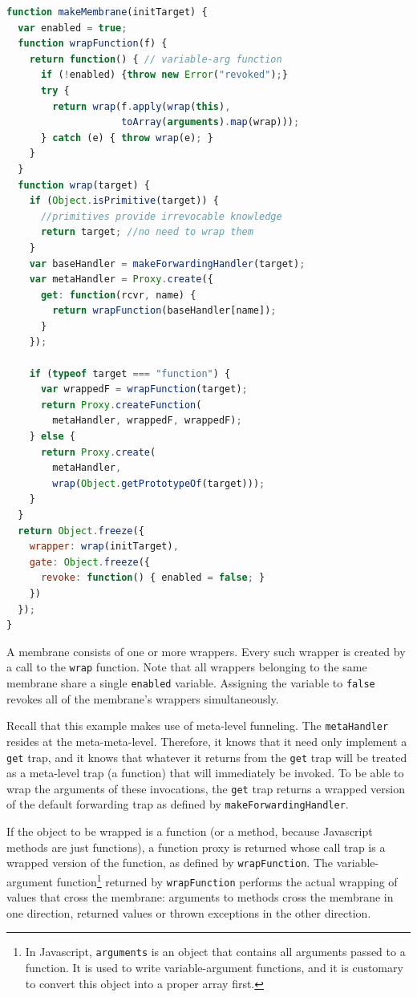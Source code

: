 \documentclass{acm_proc_article-sp}
\begin{document}
\begin{lstlisting}[language=javascript]
function makeMembrane(initTarget) {
  var enabled = true;
  function wrapFunction(f) {
    return function() { // variable-arg function
      if (!enabled) {throw new Error("revoked");}
      try {
        return wrap(f.apply(wrap(this),
                    toArray(arguments).map(wrap)));
      } catch (e) { throw wrap(e); } 
    }
  }
  function wrap(target) {
    if (Object.isPrimitive(target)) {
      //primitives provide irrevocable knowledge
      return target; //no need to wrap them
    } 
    var baseHandler = makeForwardingHandler(target);
    var metaHandler = Proxy.create({
      get: function(rcvr, name) {
        return wrapFunction(baseHandler[name]);
      }
    });
    
    if (typeof target === "function") {
      var wrappedF = wrapFunction(target);
      return Proxy.createFunction(
        metaHandler, wrappedF, wrappedF);
    } else {
      return Proxy.create(
        metaHandler,
        wrap(Object.getPrototypeOf(target)));
    }
  }
  return Object.freeze({
    wrapper: wrap(initTarget),
    gate: Object.freeze({
      revoke: function() { enabled = false; }
    })
  });
}
\end{lstlisting}

A membrane consists of one or more wrappers. Every such wrapper is created by a call to the \texttt{wrap} function. Note that all wrappers belonging to the same membrane share a single \texttt{enabled} variable. Assigning the variable to \texttt{false} revokes all of the membrane's wrappers simultaneously.

Recall that this example makes use of meta-level funneling. The \texttt{metaHandler} resides at the meta-meta-level. Therefore, it knows that it need only implement a \texttt{get} trap, and it knows that whatever it returns from the \texttt{get} trap will be treated as a meta-level trap (a function) that will immediately be invoked. To be able to wrap the arguments of these invocations, the \texttt{get} trap returns a wrapped version of the default forwarding trap as defined by \texttt{makeForwardingHandler}.

If the object to be wrapped is a function (or a method, because Javascript methods are just functions), a function proxy is returned whose call trap is a wrapped version of the function, as defined by \texttt{wrapFunction}. The variable-argument function\footnote{In Javascript, \texttt{arguments} is an object that contains all arguments passed to a function. It is used to write variable-argument functions, and it is customary to convert this object into a proper array first.} returned by \texttt{wrapFunction} performs the actual wrapping of values that cross the membrane: arguments to methods cross the membrane in one direction, returned values or thrown exceptions in the other direction.
\end{document}
